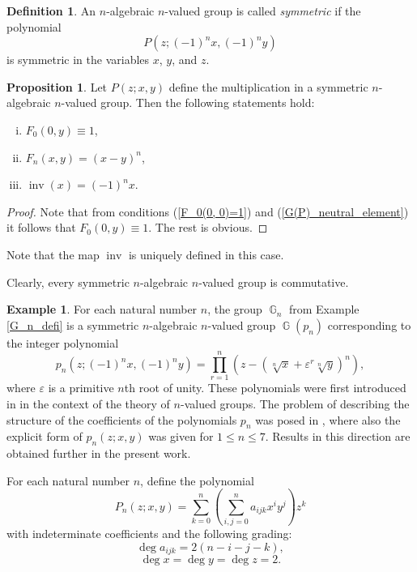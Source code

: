 \documentclass[14pt, dvipsnames]{extarticle}
\theoremstyle{definition}
\newtheorem{prop}{Proposition}
\theoremstyle{definition}
\newtheorem{defi}{Definition}
\newtheorem{example}{\bf Example}
\theoremstyle{remark}
\DeclareMathOperator{\G}{\mathbb{G}}
\DeclareMathOperator{\inv}{\mathrm{inv}}
\renewcommand{\epsilon}{\varepsilon}
\begin{document}
\begin{defi}\label{symmetric_n-algebraic_n-valued}
An $n$-algebraic $n$-valued group is called {\it symmetric} if the polynomial $$P(z; (-1)^nx, (-1)^ny)$$ is symmetric in the variables $x$, $y$, and $z$.
\end{defi}

\begin{prop}
Let $P(z; x, y)$ define the multiplication in a symmetric $n$-algebraic $n$-valued group. Then the following statements hold:

\begin{enumerate}[(i)]

\item $F_0(0, y) \equiv 1$,

\item $F_n(x, y) = (x - y)^n$,

\item $\inv(x) = (-1)^nx$.

\end{enumerate}
\end{prop}

\begin{proof}
Note that from conditions (\ref{F_0(0, 0)=1}) and (\ref{G(P)_neutral_element}) it follows that $F_0(0, y) \equiv 1$. The rest is obvious.
\end{proof}

Note that the map $\inv$ is uniquely defined in this case.

Clearly, every symmetric $n$-algebraic $n$-valued group is commutative.

\begin{example}\label{G(p_n)}
For each natural number $n$, the group $\G_n$ from Example \ref{G_n_defi} is a symmetric $n$-algebraic $n$-valued group $\G(p_n)$ corresponding to the integer polynomial
$$p_n(z; (-1)^nx, (-1)^ny) = \prod\limits_{r = 1}^n (z - (\sqrt[n]{x} + \epsilon^r\sqrt[n]{y})^n),$$
where $\epsilon$ is a primitive $n$th root of unity. These polynomials were first introduced in \cite{Buchstaber_Novikov} in the context of the theory of $n$-valued groups. The problem of describing the structure of the coefficients of the polynomials $p_n$ was posed in \cite{Buchstaber}, where also the explicit form of $p_n(z; x, y)$ was given for $1\leqslant n\leqslant 7$. Results in this direction are obtained further in the present work.
\end{example}



For each natural number $n$, define the polynomial
\begin{equation}\label{P_universal}
P_n(z; x, y) = \sum\limits_{k=0}^n\left(\sum\limits_{i,j = 0}^n a_{ijk}x^iy^j\right) z^k
\end{equation}
with indeterminate coefficients and the following grading:
$$\deg a_{ijk}  = 2(n - i - j -k),$$
$$\deg x = \deg y = \deg z = 2.$$
\end{document}
